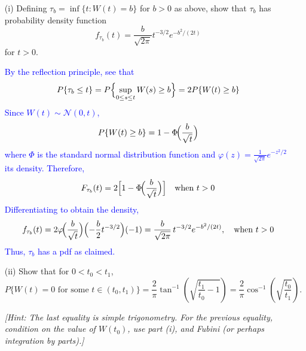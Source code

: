 \documentclass{article}
\begin{document}
\begin{enumerate}
    \item[(i)] Defining $\tau_b = \inf\{t : W(t) = b\}$ for $b > 0$ as above, show that $\tau_b$ has probability density function
    \[
    f_{\tau_b}(t) = \frac{b}{\sqrt{2\pi}} t^{-3/2} e^{-b^2/(2t)}
    \]
    for $t > 0$.

    \textcolor{blue}{
By the reflection principle, see that
$$
P\{\tau_b\le t\}=P\Bigl\{\sup_{0\le s\le t}W(s)\ge b\Bigr\}=2P\{W(t)\ge b\}
$$
Since $W(t)\sim\mathcal N(0,t)$,
$$
P\{W(t)\ge b\}=1-\Phi\!\Bigl(\frac{b}{\sqrt t}\Bigr)
$$
where $\Phi$ is the standard normal distribution function and $\varphi(z)=\frac1{\sqrt{2\pi}}e^{-z^{2}/2}$ its density. Therefore,
$$
F_{\tau_b}(t)=2\Bigl[1-\Phi\!\Bigl(\frac{b}{\sqrt t}\Bigr)\Bigr]
\quad \text{when }t>0
$$
Differentiating to obtain the density,
$$
f_{\tau_b}(t)=2\varphi\!\Bigl(\frac{b}{\sqrt t}\Bigr)\Bigl(-\frac{b}{2}t^{-3/2}\Bigr)(-1)
=\frac{b}{\sqrt{2\pi}}\,t^{-3/2}e^{-b^{2}/(2t)},
              \quad \text{when }t>0
$$
Thus, $\tau_b$ has a pdf as claimed.
    }
    
    \item[(ii)] Show that for $0 < t_0 < t_1$,
    \[
    P\{W(t) = 0 \text{ for some } t \in (t_0, t_1)\} = \frac{2}{\pi} \tan^{-1} \left( \sqrt{\frac{t_1}{t_0} - 1} \right) = \frac{2}{\pi} \cos^{-1} \left( \sqrt{\frac{t_0}{t_1}} \right).
    \]
    
    \textit{[Hint: The last equality is simple trigonometry. For the previous equality, condition on the value of $W(t_0)$, use part (i), and Fubini (or perhaps integration by parts).]}


\end{enumerate}
\end{document}
